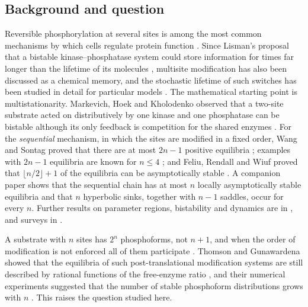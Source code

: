 \documentclass[11pt]{article}
\theoremstyle{plain}
\theoremstyle{definition}
\theoremstyle{remark}
\numberwithin{equation}{section}
\begin{document}
\subsection{Background and question}
Reversible phosphorylation at several sites is among the most common mechanisms by which cells
regulate protein function \cite{Cohen2000,SalazarHofer2009}. Since Lisman's proposal that a
bistable kinase--phosphatase system could store information for times far longer than the
lifetime of its molecules \cite{Crick1984,Lisman1985}, multisite modification has also been
discussed as a chemical memory, and the stochastic lifetime of such switches has been studied
in detail for particular models \cite{Bialek2001,MZLW2005}. The mathematical starting point is
multistationarity. Markevich, Hoek and Kholodenko observed that a two-site substrate acted on
distributively by one kinase and one phosphatase can be bistable although its only feedback is
competition for the shared enzymes \cite{Markevich2004}. For the \emph{sequential} mechanism,
in which the sites are modified in a fixed order, Wang and Sontag proved that there are at most
\(2n-1\) positive equilibria \cite{WangSontag2008}; examples with \(2n-1\) equilibria are known
for \(n\le4\) \cite{FHC2014}; and Feliu, Rendall and Wiuf proved that \(\lfloor n/2\rfloor+1\)
of the equilibria can be asymptotically stable \cite{FRW2020}. A companion paper
\cite{Companion} shows that the sequential chain has at most \(n\) locally asymptotically
stable equilibria and that \(n\) hyperbolic sinks, together with \(n-1\) saddles, occur for
every \(n\). Further results on parameter regions, bistability and dynamics are in
\cite{Gunawardena2005,ConradiFlockerziRaisch2008,FeliuWiuf2012,HolsteinFlockerziConradi2013,
ConradiMincheva2014,HellRendall2015,CFMW2017,BihanDickensteinGiaroli2020,FKdWY2022,FKdWY2023,
TorresFeliu2021}, and surveys in \cite{ConradiShiu2018,Dickenstein2016,Dickenstein2020}.

A substrate with \(n\) sites has \(2^n\) phosphoforms, not \(n+1\), and when the order of
modification is not enforced all of them participate
\cite{Gunawardena2007,SuwanmajoKrishnan2015}. Thomson and Gunawardena showed that the
equilibria of such post-translational modification systems are still described by rational
functions of the free-enzyme ratio \cite{ThomsonGunawardena2009b,ManraiGunawardena2008}, and
their numerical experiments suggested that the number of stable phosphoform distributions
grows with \(n\) \cite{ThomsonGunawardena2009}. This raises the question studied here.
\end{document}
